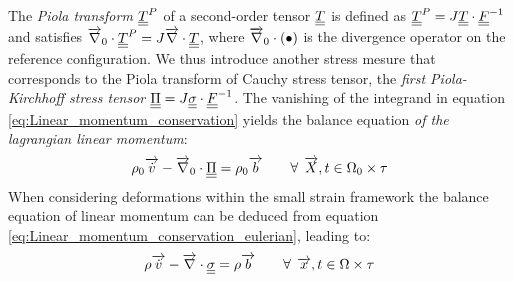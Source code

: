 The \textit{Piola transform ${\underline{\underline{T}}}^P$} of a second-order tensor ${\underline{\underline{T}}}$ is defined as ${\underline{\underline{T}}}^P=J{\underline{\underline{T}}}\cdot{\underline{\underline{F}}}^{-1}$ and satisfies ${\overrightarrow{\nabla}}_0\cdot {\underline{\underline{T}}}^P = J {\overrightarrow{\nabla}} \cdot {\underline{\underline{T}}}$, where ${\overrightarrow{\nabla}}_0\cdot (\bullet)$ is the divergence operator on the reference configuration. We thus introduce another stress mesure that corresponds to the Piola transform of Cauchy stress tensor, the \textit{first Piola-Kirchhoff stress tensor} ${\underline{\underline{\Pi}}}=J{\underline{\underline{\sigma}}}\cdot{\underline{\underline{F}}}^{-1}$. The vanishing of the integrand in equation \eqref{eq:Linear_momentum_conservation} yields the balance equation \textit{of the lagrangian linear momentum}:
\begin{equation}
  \label{eq:Lagrangian_linear_momentum}
  \rho_0 {\overrightarrow{\dot{v}}} - {\overrightarrow{\nabla}}_0 \cdot {\underline{\underline{\Pi}}} = \rho_0 {\overrightarrow{b}} \qquad \forall \: \: {\overrightarrow{X}},t \in \Omega_0 \times \tau 
\end{equation}
When considering deformations within the small strain framework the balance equation of linear momentum can be deduced from equation \eqref{eq:Linear_momentum_conservation_eulerian}, leading to:
\begin{equation}
  \label{eq:HPP_linear_momentum}
  \rho {\overrightarrow{\dot{v}}} - {\overrightarrow{\nabla}} \cdot {\underline{\underline{\sigma}}} = \rho {\overrightarrow{b}}  \qquad \forall \: \: {\overrightarrow{x}},t \in \Omega \times \tau 
\end{equation}

